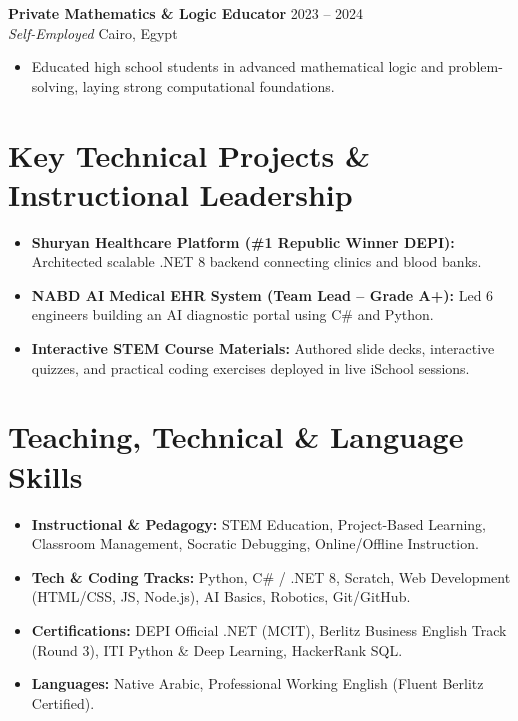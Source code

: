 \documentclass[11pt,a4paper]{article}
\begin{document}
\textbf{Private Mathematics \& Logic Educator} \hfill 2023 -- 2024 \\
\textit{Self-Employed} \hfill Cairo, Egypt
\begin{itemize}[leftmargin=*, nosep]
    \item Educated high school students in advanced mathematical logic and problem-solving, laying strong computational foundations.
\end{itemize}

\section{Key Technical Projects \& Instructional Leadership}
\begin{itemize}[leftmargin=*, nosep]
    \item \textbf{Shuryan Healthcare Platform (\#1 Republic Winner DEPI):} Architected scalable .NET 8 backend connecting clinics and blood banks.
    \item \textbf{NABD AI Medical EHR System (Team Lead -- Grade A+):} Led 6 engineers building an AI diagnostic portal using C\# and Python.
    \item \textbf{Interactive STEM Course Materials:} Authored slide decks, interactive quizzes, and practical coding exercises deployed in live iSchool sessions.
\end{itemize}

\section{Teaching, Technical \& Language Skills}
\begin{itemize}[leftmargin=*, nosep]
    \item \textbf{Instructional \& Pedagogy:} STEM Education, Project-Based Learning, Classroom Management, Socratic Debugging, Online/Offline Instruction.
    \item \textbf{Tech \& Coding Tracks:} Python, C\# / .NET 8, Scratch, Web Development (HTML/CSS, JS, Node.js), AI Basics, Robotics, Git/GitHub.
    \item \textbf{Certifications:} DEPI Official .NET (MCIT), Berlitz Business English Track (Round 3), ITI Python \& Deep Learning, HackerRank SQL.
    \item \textbf{Languages:} Native Arabic, Professional Working English (Fluent Berlitz Certified).
\end{itemize}
\end{document}
